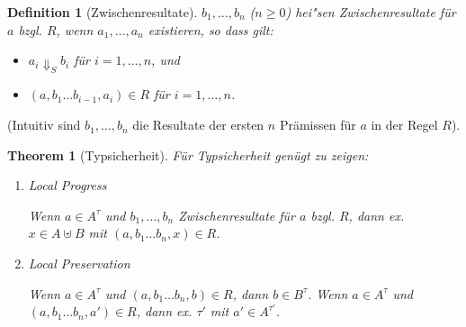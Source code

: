 \documentclass[12pt,a2paper,draft]{article}
\newtheorem{theorem}{Theorem}
\newtheorem{definition}{Definition}
\begin{document}
\begin{definition}[Zwischenresultate]
  $b_1,\ldots,b_n$ ($n \ge 0$) hei"sen \emph{Zwischenresultate} f\"ur $a$ bzgl. $R$, wenn
  $a_1,\ldots,a_n$ existieren, so dass gilt:
  \begin{itemize}
  \item $a_i \Downarrow_S b_i$ f\"ur $i=1,\ldots,n$, und
  \item $(a,b_1 \ldots b_{i-1}, a_i) \in R$ f\"ur $i = 1,\ldots,n$.
  \end{itemize}
\end{definition}

\noindent
(Intuitiv sind $b_1,\ldots,b_n$ die Resultate der ersten $n$ Pr\"amissen f\"ur $a$ in der
Regel $R$).

\begin{theorem}[Typsicherheit]
  F\"ur Typsicherheit gen\"ugt zu zeigen:
  \begin{enumerate}
  \item \emph{Local Progress}

    Wenn $a \in A^\tau$ und $b_1,\ldots,b_n$ Zwischenresultate f\"ur $a$ bzgl. $R$,
    dann ex. $x \in A \uplus B$ mit $(a,b_1 \ldots b_n,x) \in R$.

  \item \emph{Local Preservation}

    Wenn $a \in A^\tau$ und $(a,b_1 \ldots b_n,b) \in R$, dann $b \in B^\tau$.
    Wenn $a \in A^\tau$ und $(a,b_1 \ldots b_n,a') \in R$, dann ex. $\tau'$ mit $a' \in A^{\tau'}$.
  \end{enumerate}
\end{theorem}



%
%
\end{document}
